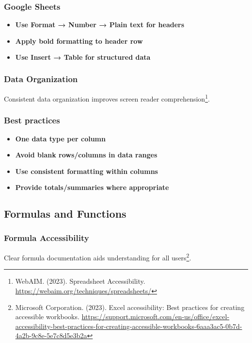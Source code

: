 \subsubsection{Google Sheets}
\vspace{1em}
\begin{itemize}
\item \textbf{Use Format → Number → Plain text for headers}
\item \textbf{Apply bold formatting to header row}
\item \textbf{Use Insert → Table for structured data}
\end{itemize}
\vspace{1em}

\subsubsection{Data Organization}
Consistent data organization improves screen reader comprehension\footnote{WebAIM. (2023). Spreadsheet Accessibility. \url{https://webaim.org/techniques/spreadsheets/}}.

\subsubsection{Best practices}
\vspace{1em}
\begin{itemize}
\item \textbf{One data type per column}
\item \textbf{Avoid blank rows/columns in data ranges}
\item \textbf{Use consistent formatting within columns}
\item \textbf{Provide totals/summaries where appropriate}
\end{itemize}
\vspace{1em}

\subsection{Formulas and Functions}

\subsubsection{Formula Accessibility}
Clear formula documentation aids understanding for all users\footnote{Microsoft Corporation. (2023). Excel accessibility: Best practices for creating accessible workbooks. \url{https://support.microsoft.com/en-us/office/excel-accessibility-best-practices-for-creating-accessible-workbooks-6aaa3ac5-0b7d-4a2b-9c8e-5e7c8d5e3b2a}}.

